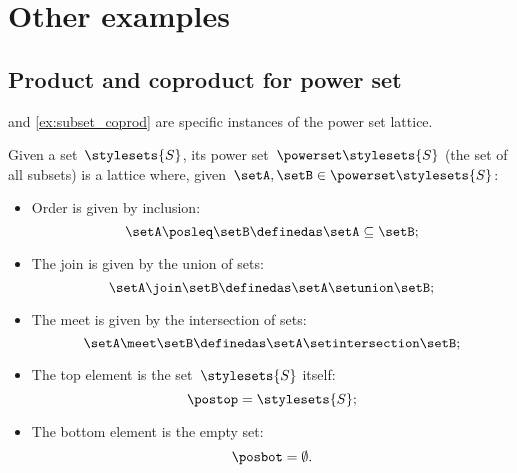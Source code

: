 
\section{Other examples}

\subsection{Product and coproduct for power set}
 and \cref{ex:subset_coprod} are specific instances of the power set lattice.

\begin{ctdefinition}
    \label{def:power-set-as-lattice}
    Given a set~$\stylesets{S}$, its power set~$\powerset \stylesets{S}$ (the set of all subsets) is a lattice where, given~$\setA,\setB\in \powerset \stylesets{S}$:
    \begin{itemize}
        \item Order is given by inclusion:
              \begin{equation*}
                  \setA\posleq \setB \definedas \setA\subseteq \setB;
              \end{equation*}
        \item The join is given by the union of sets:
              \begin{equation*}
                  \setA\join \setB \definedas \setA\setunion \setB;
              \end{equation*}
        \item The meet is given by the intersection of sets:
              \begin{equation*}
                  \setA\meet \setB \definedas \setA\setintersection \setB;
              \end{equation*}
        \item The top element is the set~$\stylesets{S}$ itself:
              \begin{equation*}
                  \postop = \stylesets{S};
              \end{equation*}
        \item The bottom element is the empty set:
              \begin{equation*}
                  \posbot = \emptyset.
              \end{equation*}
    \end{itemize}
\end{ctdefinition}

